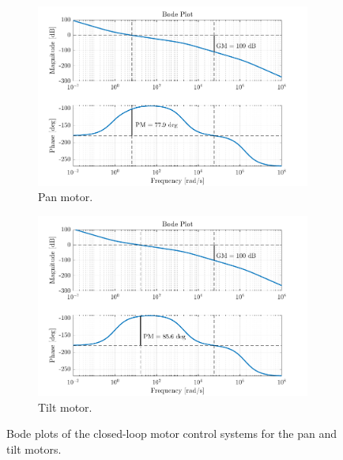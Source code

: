 \documentclass[../../main.tex]{subfiles}
\begin{document}
\begin{figure}[h]
\begin{subfigure}{0.49\textwidth}
    \includegraphics[width = 0.99\textwidth]{Sections/System_Design/Images/SM_PanMotorPos2.png}
    \caption{Pan motor.}
    \label{fig:pos_stability_plot_pan}
\end{subfigure}\quad
\begin{subfigure}{0.49\textwidth}
    \includegraphics[width = 0.99\textwidth]{Sections/System_Design/Images/SM_TiltMotorPos.png}
    \caption{Tilt motor.}
    \label{fig:pos_stability_plot_tilt}
\end{subfigure}
\caption{Bode plots of the closed-loop motor control systems for the pan and tilt motors.}
\label{fig:pos_stability_plot}
\end{figure}
\end{document}
